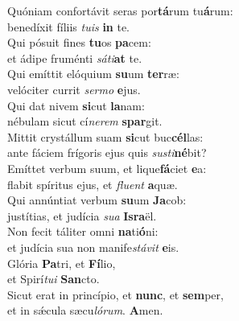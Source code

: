 \evenverse Quóniam confortávit seras por\textbf{tá}rum tu\textbf{á}rum:~\*\\
\evenverse benedíxit fíliis \textit{tu}\textit{is} \textbf{in} te.\\
\oddverse Qui pósuit fines \textbf{tu}os \textbf{pa}cem:~\*\\
\oddverse et ádipe fruménti \textit{sá}\textit{ti}\textbf{at} te.\\
\evenverse Qui emíttit elóquium \textbf{su}um \textbf{ter}ræ:~\*\\
\evenverse velóciter currit \textit{ser}\textit{mo} \textbf{e}jus.\\
\oddverse Qui dat nivem \textbf{si}cut \textbf{la}nam:~\*\\
\oddverse nébulam sicut cí\textit{ne}\textit{rem} \textbf{spar}git.\\
\evenverse Mittit crystállum suam \textbf{si}cut buc\textbf{cél}las:~\*\\
\evenverse ante fáciem frígoris ejus quis \textit{su}\textit{sti}\textbf{né}bit?\\
\oddverse Emíttet verbum suum, et lique\textbf{fá}ciet \textbf{e}a:~\*\\
\oddverse flabit spíritus ejus, et \textit{flu}\textit{ent} \textbf{a}quæ.\\
\evenverse Qui annúntiat verbum \textbf{su}um \textbf{Ja}cob:~\*\\
\evenverse justítias, et judícia \textit{su}\textit{a} \textbf{Is}\textbf{ra}ël.\\
\oddverse Non fecit táliter omni \textbf{na}ti\textbf{ó}ni:~\*\\
\oddverse et judícia sua non manife\textit{stá}\textit{vit} \textbf{e}is.\\
\evenverse Glória \textbf{Pa}tri, et \textbf{Fí}lio,~\*\\
\evenverse et Spirí\textit{tu}\textit{i} \textbf{San}cto.\\
\oddverse Sicut erat in princípio, et \textbf{nunc}, et \textbf{sem}per,~\*\\
\oddverse et in sǽcula sæcu\textit{ló}\textit{rum}. \textbf{A}men.\\
